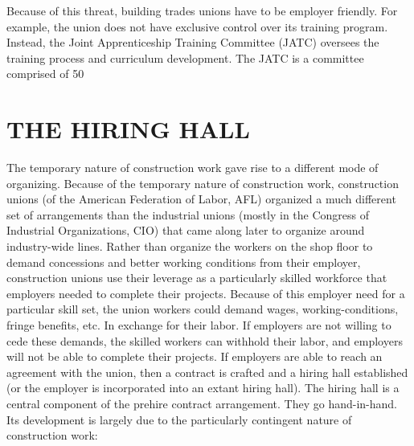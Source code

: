 Because of this threat, building trades unions have to be employer friendly. For example, the union does not have exclusive control over its training program. Instead, the Joint Apprenticeship Training Committee (JATC) oversees the training process and curriculum development. The JATC is a committee comprised of 50%

\section{THE HIRING HALL}

The temporary nature of construction work gave rise to a different mode of organizing. Because of the temporary nature of construction work, construction unions (of the American Federation of Labor, AFL) organized a much different set of arrangements than the industrial unions (mostly in the Congress of Industrial Organizations, CIO) that came along later to organize around industry-wide lines. Rather than organize the workers on the shop floor to demand concessions and better working conditions from their employer, construction unions use their leverage as a particularly skilled workforce that employers needed to complete their projects. Because of this employer need for a particular skill set, the union workers could demand wages, working-conditions, fringe benefits, etc. In exchange for their labor. If employers are not willing to cede these demands, the skilled workers can withhold their labor, and employers will not be able to complete their projects. If employers are able to reach an agreement with the union, then a contract is crafted and a hiring hall established (or the employer is incorporated into an extant hiring hall). The hiring hall is a central component of the prehire contract arrangement. They go hand-in-hand. Its development is largely due to the particularly contingent nature of construction work:

